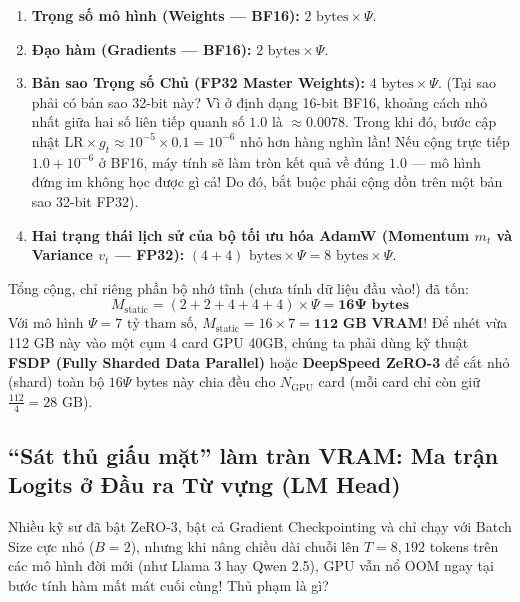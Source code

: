 \begin{enumerate}
  \item \textbf{Trọng số mô hình (Weights --- BF16):} $2\text{ bytes} \times \Psi$.
  \item \textbf{Đạo hàm (Gradients --- BF16):} $2\text{ bytes} \times \Psi$.
  \item \textbf{Bản sao Trọng số Chủ (FP32 Master Weights):} $4\text{ bytes} \times \Psi$.
  (Tại sao phải có bản sao 32-bit này? Vì ở định dạng 16-bit BF16, khoảng cách nhỏ nhất giữa hai số liên tiếp quanh số $1.0$ là $\approx 0.0078$. Trong khi đó, bước cập nhật $\text{LR} \times g_t \approx 10^{-5} \times 0.1 = 10^{-6}$ nhỏ hơn hàng nghìn lần! Nếu cộng trực tiếp $1.0 + 10^{-6}$ ở BF16, máy tính sẽ làm tròn kết quả về đúng $1.0$ --- mô hình đứng im không học được gì cả! Do đó, bắt buộc phải cộng dồn trên một bản sao 32-bit FP32).
  \item \textbf{Hai trạng thái lịch sử của bộ tối ưu hóa AdamW (Momentum $m_t$ và Variance $v_t$ --- FP32):} $(4 + 4)\text{ bytes} \times \Psi = 8\text{ bytes} \times \Psi$.
\end{enumerate}

Tổng cộng, chỉ riêng phần bộ nhớ tĩnh (chưa tính dữ liệu đầu vào!) đã tốn:
\begin{equation}
  M_{\text{static}} = (2 + 2 + 4 + 4 + 4) \times \Psi = \mathbf{16\Psi \text{ bytes}}
  \label{eq:16psi_rule}
\end{equation}
Với mô hình $\Psi = 7\text{ tỷ tham số}$, $M_{\text{static}} = 16 \times 7 = \mathbf{112\text{ GB VRAM}}$! Để nhét vừa 112 GB này vào một cụm 4 card GPU 40GB, chúng ta phải dùng kỹ thuật \textbf{FSDP (Fully Sharded Data Parallel)} \citep{zhao2023pytorch} hoặc \textbf{DeepSpeed ZeRO-3} \citep{rajbhandari2020zero} để cắt nhỏ (shard) toàn bộ $16\Psi$ bytes này chia đều cho $N_{\text{GPU}}$ card (mỗi card chỉ còn giữ $\frac{112}{4} = 28\text{ GB}$).

\subsection{``Sát thủ giấu mặt'' làm tràn VRAM: Ma trận Logits ở Đầu ra Từ vựng (LM Head)}

Nhiều kỹ sư đã bật ZeRO-3, bật cả Gradient Checkpointing và chỉ chạy với Batch Size cực nhỏ ($B = 2$), nhưng khi nâng chiều dài chuỗi lên $T = 8{,}192$ tokens trên các mô hình đời mới (như Llama 3 hay Qwen 2.5), GPU vẫn nổ OOM ngay tại bước tính hàm mất mát cuối cùng! Thủ phạm là gì?

